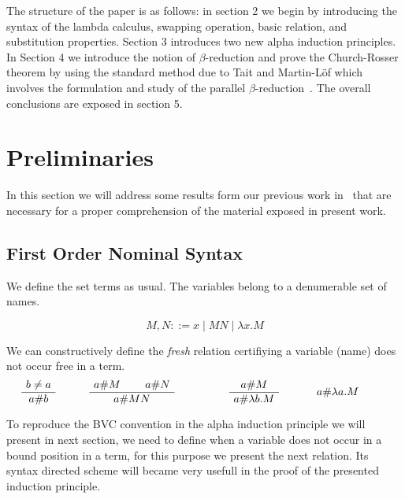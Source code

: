 \documentclass[preprint,10pt]{sigplanconf}
\newcommand{\lam}{\ensuremath{\lambda}}
\begin{document}
The structure of the paper is as follows: in section 2 we begin by introducing the syntax of the lambda calculus, swapping operation, basic relation, and substitution properties. Section 3 introduces two new alpha induction principles. In Section 4 we introduce the notion of $\beta$-reduction and prove the Church-Rosser theorem by using the standard method due to Tait and Martin-L\"of which involves the formulation and study of the parallel $\beta$-reduction~\cite{bar:84, takahashi}. The overall conclusions are exposed in section 5.


\section{Preliminaries}
In this section we will address some results form our previous work in~\cite{CopelloTSBF16} that are necessary for a proper comprehension of the material exposed in present work.

\subsection{First Order Nominal Syntax} 

We define the set terms as usual. The variables belong to a denumerable set of names.

 \[ M,N ::= x \mid M N \mid \lam x.M \]

We can constructively define the \emph{fresh} relation certifiying a variable (name) does not occur free in a term.
\[
\begin{minipage}{0.15\linewidth}
\AxiomC{$b \neq a$}  \UnaryInfC{$a \# b$} \DisplayProof
\end{minipage} \ \ \
\begin{minipage}{0.35\linewidth}
\AxiomC{$a \# M$} 
\AxiomC{$a \# N$}
\BinaryInfC{$a \# M N$} \DisplayProof
\end{minipage} \  \
\begin{minipage}{0.2\linewidth}
\AxiomC{$a \# M$} 
\UnaryInfC{$a \# \lam b . M$} \DisplayProof
\end{minipage} \ \
\begin{minipage}{0.2\linewidth}
\AxiomC{$a \# \lam a . M $} \DisplayProof
\end{minipage}
\]

To reproduce the BVC convention in the alpha induction principle we will present in next section, we need to define when a variable does not occur in a bound position in a term, for this purpose we present the next relation. Its syntax directed scheme will became very usefull in the proof of the presented induction principle.
\end{document}
